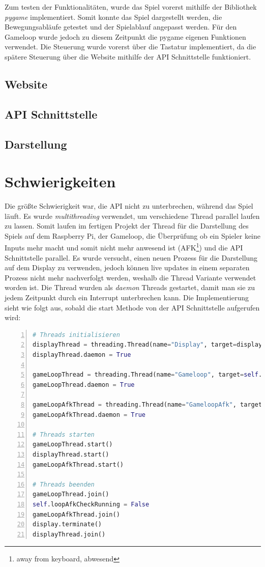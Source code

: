 \documentclass[a4paper,12pt]{scrartcl}
\begin{document}
Zum testen der Funktionalitäten, wurde das Spiel vorerst mithilfe der Bibliothek \textit{pygame} implementiert. Somit konnte das Spiel dargestellt werden, die Bewegungsabläufe getestet und der Spielablauf angepasst werden. Für den Gameloop wurde jedoch zu diesem Zeitpunkt die pygame eigenen Funktionen verwendet. Die Steuerung wurde vorerst über die Tastatur implementiert, da die spätere Steuerung über die Website mithilfe der API Schnittstelle funktioniert.

\subsection{Website}
\subsection{API Schnittstelle}
\subsection{Darstellung}


\section{Schwierigkeiten}
Die größte Schwierigkeit war, die API nicht zu unterbrechen, während das Spiel läuft. Es wurde \textit{multithreading} verwendet, um verschiedene Thread parallel laufen zu lassen. Somit laufen im fertigen Projekt der Thread für die Darstellung des Spiels auf dem Raspberry Pi, der Gameloop, die Überprüfung ob ein Spieler keine Inputs mehr macht und somit nicht mehr anwesend ist (AFK\footnote{away from keyboard, abwesend}) und die API Schnittstelle parallel. Es wurde versucht, einen neuen Prozess für die Darstellung auf dem Display zu verwenden, jedoch können live updates in einem separaten Prozess nicht mehr nachverfolgt werden, weshalb die Thread Variante verwendet worden ist. Die Thread wurden als \textit{daemon} Threads gestartet, damit man sie zu jedem Zeitpunkt durch ein Interrupt unterbrechen kann. Die Implementierung sieht wie folgt aus, sobald die start Methode von der API Schnittstelle aufgerufen wird:

\begin{lstlisting}[language=Python, numbers=left]
# Threads initialisieren
displayThread = threading.Thread(name="Display", target=display.process)
displayThread.daemon = True

gameLoopThread = threading.Thread(name="Gameloop", target=self.loop)
gameLoopThread.daemon = True

gameLoopAfkThread = threading.Thread(name="GameloopAfk", target=self.loopAfkCheck)
gameLoopAfkThread.daemon = True
        
# Threads starten
gameLoopThread.start()
displayThread.start()
gameLoopAfkThread.start()

# Threads beenden
gameLoopThread.join()
self.loopAfkCheckRunning = False
gameLoopAfkThread.join()
display.terminate()
displayThread.join()
\end{lstlisting}
\end{document}
